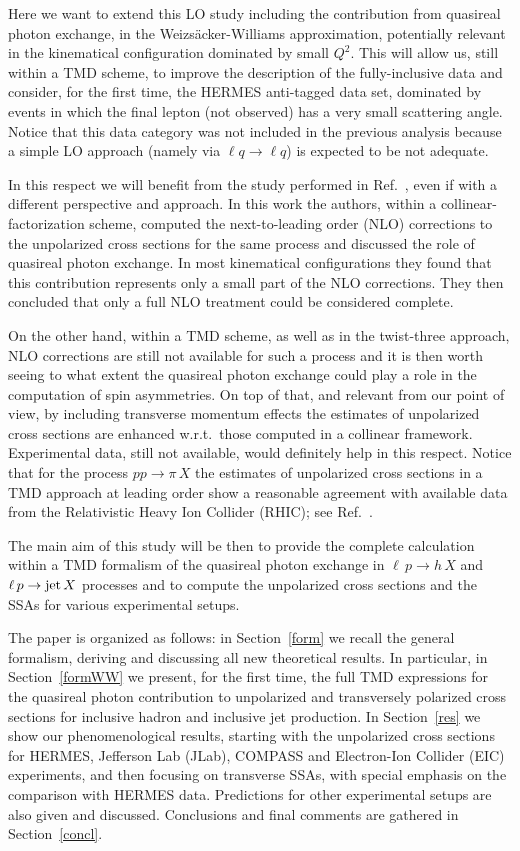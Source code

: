 \documentclass[nofootinbib,superscriptaddress,aps]{revtex4}
\begin{document}
Here we want to extend this LO study including the contribution from quasireal photon exchange, in the Weizs\"acker-Williams approximation, potentially relevant in the kinematical configuration dominated by small $Q^2$. This will allow us, still within a TMD scheme, to improve the description of the fully-inclusive data and consider, for the first time, the HERMES anti-tagged data set, dominated by events in which the final lepton (not observed) has a very small scattering angle. Notice that this data category was not included in the previous analysis because a simple LO approach (namely via $\ell q\to \ell q$) is expected to be not adequate.

In this respect we will benefit from the study performed in Ref.~\cite{Hinderer:2015hra}, even if with a different perspective and approach. In this work the authors, within a collinear-factorization scheme, computed the next-to-leading order (NLO) corrections to the unpolarized cross sections for the same process and discussed the role of quasireal photon exchange. In most kinematical configurations they found that this contribution represents only a small part of the NLO corrections. They then concluded that only a full NLO treatment could be considered complete.

On the other hand, within a TMD scheme, as well as in the twist-three approach, NLO corrections are still not available for such a process and it is then worth seeing to what extent the quasireal photon exchange could play a role in the computation of spin asymmetries. On top of that, and relevant from our point of view, by including transverse momentum effects the estimates of unpolarized cross sections are enhanced w.r.t.~those computed in a collinear framework. Experimental data, still not available, would definitely help in this respect. Notice that for the process $pp\to\pi \,X$ the estimates of unpolarized cross sections in a TMD approach at leading order show a reasonable agreement with available data from the Relativistic Heavy Ion Collider (RHIC); see Ref.~\cite{Boglione:2007dm}.

The main aim of this study will be then to provide the complete calculation within a TMD formalism of the quasireal photon exchange in $\ell\, p\to h\, X$ and $\ell\, p\to {\rm jet} \,X$ processes and to compute the unpolarized cross sections and the SSAs for various experimental setups.

The paper is organized as follows: in Section~\ref{form} we recall the general formalism, deriving and discussing all new theoretical results. In particular, in Section~\ref{formWW} we present, for the first time, the full TMD expressions for the quasireal photon contribution to unpolarized and transversely polarized cross sections for inclusive hadron and inclusive jet production. In Section~\ref{res} we show our phenomenological results, starting with the unpolarized cross sections for HERMES, Jefferson Lab (JLab), COMPASS and Electron-Ion Collider (EIC) experiments, and then focusing on transverse SSAs, with special emphasis on the comparison with HERMES data. Predictions for other experimental setups are also given and discussed. Conclusions and final comments are gathered in Section~\ref{concl}.
\end{document}
